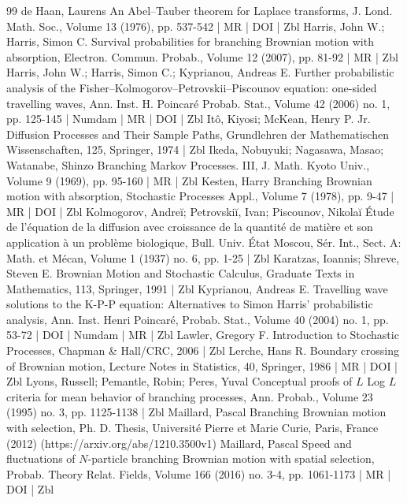 \begin{thebibliography}{99}
de Haan, Laurens An Abel–Tauber theorem for Laplace transforms, J. Lond. Math. Soc., Volume 13 (1976), pp. 537-542 | MR | DOI | Zbl
Harris, John W.; Harris, Simon C. Survival probabilities for branching Brownian motion with absorption, Electron. Commun. Probab., Volume 12 (2007), pp. 81-92 | MR | Zbl
Harris, John W.; Harris, Simon C.; Kyprianou, Andreas E. Further probabilistic analysis of the Fisher–Kolmogorov–Petrovskii–Piscounov equation: one-sided travelling waves, Ann. Inst. H. Poincaré Probab. Stat., Volume 42 (2006) no. 1, pp. 125-145 | Numdam | MR | DOI | Zbl
Itô, Kiyosi; McKean, Henry P. Jr. Diffusion Processes and Their Sample Paths, Grundlehren der Mathematischen Wissenschaften, 125, Springer, 1974 | Zbl
Ikeda, Nobuyuki; Nagasawa, Masao; Watanabe, Shinzo Branching Markov Processes. III, J. Math. Kyoto Univ., Volume 9 (1969), pp. 95-160 | MR | Zbl
Kesten, Harry Branching Brownian motion with absorption, Stochastic Processes Appl., Volume 7 (1978), pp. 9-47 | MR | DOI | Zbl
Kolmogorov, Andreĭ; Petrovskiĭ, Ivan; Piscounov, Nikolaĭ Étude de l’équation de la diffusion avec croissance de la quantité de matière et son application à un problème biologique, Bull. Univ. État Moscou, Sér. Int., Sect. A: Math. et Mécan, Volume 1 (1937) no. 6, pp. 1-25 | Zbl
Karatzas, Ioannis; Shreve, Steven E. Brownian Motion and Stochastic Calculus, Graduate Texts in Mathematics, 113, Springer, 1991 | Zbl
Kyprianou, Andreas E. Travelling wave solutions to the K-P-P equation: Alternatives to Simon Harris’ probabilistic analysis, Ann. Inst. Henri Poincaré, Probab. Stat., Volume 40 (2004) no. 1, pp. 53-72 | DOI | Numdam | MR | Zbl
Lawler, Gregory F. Introduction to Stochastic Processes, Chapman \& Hall/CRC, 2006 | Zbl
Lerche, Hans R. Boundary crossing of Brownian motion, Lecture Notes in Statistics, 40, Springer, 1986 | MR | DOI | Zbl
Lyons, Russell; Pemantle, Robin; Peres, Yuval Conceptual proofs of ${L}$ Log ${L}$ criteria for mean behavior of branching processes, Ann. Probab., Volume 23 (1995) no. 3, pp. 1125-1138 | Zbl
Maillard, Pascal Branching Brownian motion with selection, Ph. D. Thesis, Université Pierre et Marie Curie, Paris, France (2012) (https://arxiv.org/abs/1210.3500v1)
Maillard, Pascal Speed and fluctuations of ${N}$-particle branching Brownian motion with spatial selection, Probab. Theory Relat. Fields, Volume 166 (2016) no. 3-4, pp. 1061-1173 | MR | DOI | Zbl

\end{thebibliography}
